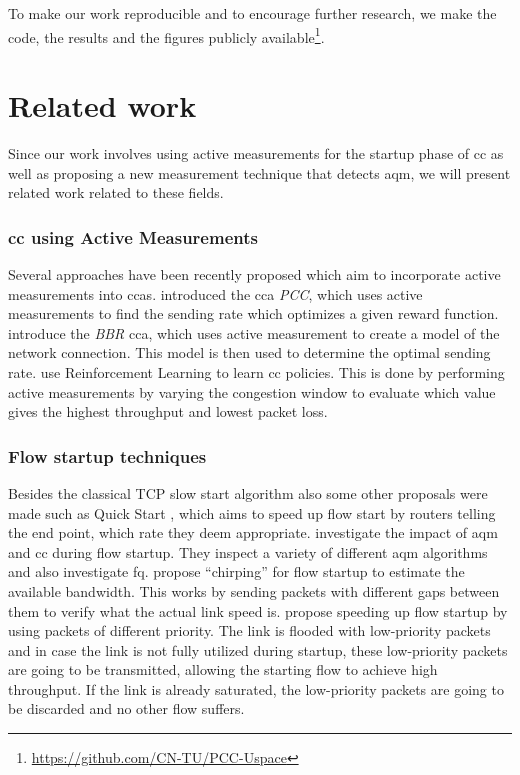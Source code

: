 \documentclass[runningheads]{llncs}
\begin{document}
To make our work reproducible and to encourage further research, we make the code, the results and the figures publicly available\footnote{\url{https://github.com/CN-TU/PCC-Uspace}}. 

\section{Related work}
Since our work involves using active measurements for the startup phase of \gls{cc} as well as proposing a new measurement technique that detects \gls{aqm}, we will present related work related to these fields. 

\subsubsection{\gls{cc} using Active Measurements}
Several approaches have been recently proposed which aim to incorporate active measurements into \glspl{cca}. \cite{dong_pcc_2015,dong_pcc_2018} introduced the \gls{cca} \textit{PCC}, which uses active measurements to find the sending rate which optimizes a given reward function. \cite{cardwell_bbr:_2016} introduce the \textit{BBR} \gls{cca}, which uses active measurement to create a model of the network connection. This model is then used to determine the optimal sending rate. \cite{bachl_rax_2019} use Reinforcement Learning to learn \gls{cc} policies. This is done by performing active measurements by varying the congestion window to evaluate which value gives the highest throughput and lowest packet loss. 

\subsubsection{Flow startup techniques} Besides the classical TCP slow start algorithm \cite{stevens_tcp_1997} also some other proposals were made such as Quick Start \cite{jain_quick-start_2019}, which aims to speed up flow start by routers telling the end point, which rate they deem appropriate. \cite{jarvinen_congestion_2019} investigate the impact of \gls{aqm} and \gls{cc} during flow startup. They inspect a variety of different \gls{aqm} algorithms and also investigate \gls{fq}. \cite{kuhlewind_chirping_2010} propose ``chirping'' for flow startup to estimate the available bandwidth. This works by sending packets with different gaps between them to verify what the actual link speed is. \cite{mittal_recursively_2014} propose speeding up flow startup by using packets of different priority. The link is flooded with low-priority packets and in case the link is not fully utilized during startup, these low-priority packets are going to be transmitted, allowing the starting flow to achieve high throughput. If the link is already saturated, the low-priority packets are going to be discarded and no other flow suffers. 
\end{document}
